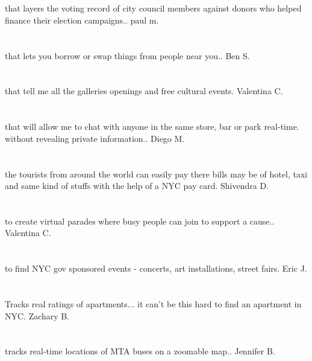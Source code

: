 \section{}that layers the voting record of city council members against donors who helped finance their election campaigns.. paul m.
\section{}that lets you borrow or swap things from people near you.. Ben S.
\section{}that tell me all the galleries openings and free cultural events. Valentina C.
\section{}that will allow me to chat with anyone in the same store,  bar or park real-time. without revealing private information.. Diego M.
\section{}the tourists from around the world can easily pay there bills may be of hotel,  taxi and same kind of stuffs with the help of a NYC pay card. Shivendra D.
\section{}to create virtual parades where busy people can join to support a cause.. Valentina C.
\section{}to find NYC gov sponsored events - concerts,  art installations,  street fairs. Eric J.
\section{}Tracks real ratings of apartments... it can't be this hard to find an apartment in NYC. Zachary B.
\section{}tracks real-time locations of MTA buses on a zoomable map.. Jennifer B.
